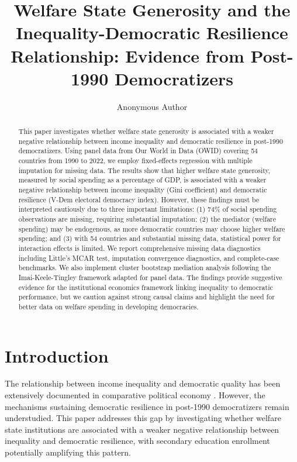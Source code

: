 \documentclass[11pt,letterpaper]{article}
\title{Welfare State Generosity and the Inequality-Democratic Resilience Relationship: Evidence from Post-1990 Democratizers}
\author{Anonymous Author}
\date{}
\begin{document}
\maketitle

\begin{abstract}
This paper investigates whether welfare state generosity is associated with a weaker negative relationship between income inequality and democratic resilience in post-1990 democratizers. Using panel data from Our World in Data (OWID) covering 54 countries from 1990 to 2022, we employ fixed-effects regression with multiple imputation for missing data. The results show that higher welfare state generosity, measured by social spending as a percentage of GDP, is associated with a weaker negative relationship between income inequality (Gini coefficient) and democratic resilience (V-Dem electoral democracy index). However, these findings must be interpreted cautiously due to three important limitations: (1) 74\% of social spending observations are missing, requiring substantial imputation; (2) the mediator (welfare spending) may be endogenous, as more democratic countries may choose higher welfare spending; and (3) with 54 countries and substantial missing data, statistical power for interaction effects is limited. We report comprehensive missing data diagnostics including Little's MCAR test, imputation convergence diagnostics, and complete-case benchmarks. We also implement cluster bootstrap mediation analysis following the Imai-Keele-Tingley framework adapted for panel data. The findings provide suggestive evidence for the institutional economics framework linking inequality to democratic performance, but we caution against strong causal claims and highlight the need for better data on welfare spending in developing democracies.
\end{abstract}

\newpage

\section{Introduction}

The relationship between income inequality and democratic quality has been extensively documented in comparative political economy \cite{Acemoglu2019, Knutsen2020}. However, the mechanisms sustaining democratic resilience in post-1990 democratizers remain understudied. This paper addresses this gap by investigating whether welfare state institutions are associated with a weaker negative relationship between inequality and democratic resilience, with secondary education enrollment potentially amplifying this pattern.
\end{document}
